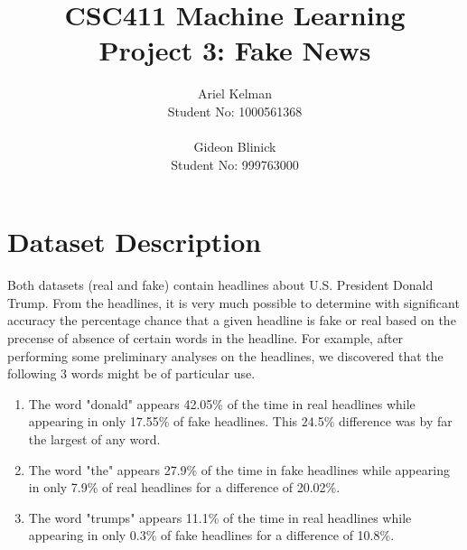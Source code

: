 \documentclass{article}
\title{CSC411 Machine Learning \\ Project 3: Fake News}
\author{ Ariel Kelman \\ Student No: 1000561368
         \\ \\
         Gideon Blinick \\ Student No: 999763000 }
\begin{document}
   \maketitle{}


   \section{Dataset Description}

Both datasets (real and fake) contain headlines about U.S. President Donald Trump.
From the headlines, it is very much possible to determine with significant accuracy the percentage chance that a given headline
is fake or real based on the precense of absence of certain words in the headline.
For example, after performing some preliminary analyses on the headlines, we discovered that the following 3 words might be of particular use.
\begin{enumerate}
\item The word "donald" appears 42.05\% of the time in real headlines while appearing in only 17.55\% of fake headlines. This 24.5\% difference was by far the largest of any word.

\item The word "the" appears 27.9\% of the time in fake headlines while appearing in only 7.9\% of real headlines for a difference of 20.02\%.
\item The word "trumps" appears 11.1\% of the time in real headlines while appearing in only 0.3\% of fake headlines for a difference of 10.8\%.
\end{enumerate}



\end{document}
